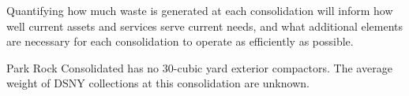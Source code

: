 
    Quantifying how much waste is generated at each consolidation will inform how well current assets and services serve current needs, and what additional elements are necessary for each consolidation to operate as efficiently as possible.
    
    Park Rock Consolidated has no 30-cubic yard exterior compactors. The average weight of DSNY collections at this consolidation are unknown.